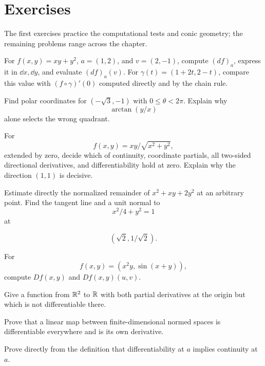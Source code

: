 \section*{Exercises}
The first exercises practice the computational tests and conic geometry;
the remaining problems range across the chapter.
\begin{exercise}
For $f(x,y)=xy+y^2$, $a=(1,2)$, and $v=(2,-1)$, compute $(df)_a$,
express it in $\dd x,\dd y$, and evaluate $(df)_a(v)$. For
$\gamma(t)=(1+2t,2-t)$, compare this value with $(f\circ\gamma)'(0)$
computed directly and by the chain rule.
\end{exercise}
\begin{exercise}
Find polar coordinates for $(-\sqrt3,-1)$ with $0\leq\theta<2\pi$.
Explain why
\[
\arctan(y/x)
\]
 alone selects the wrong quadrant.
\end{exercise}
\begin{exercise}
For
\[
f(x,y)=xy/\sqrt{x^2+y^2},
\]
 extended by zero, decide which of continuity,
coordinate partials, all two-sided directional derivatives, and differentiability
hold at zero. Explain why the direction $(1,1)$ is decisive.
\end{exercise}
\begin{exercise}
Estimate directly the normalized remainder of $x^2+xy+2y^2$ at an arbitrary
point. Find the tangent line and a unit normal to
\[
x^2/4+y^2=1
\]
 at

\[
(\sqrt2,1/\sqrt2).
\]

\end{exercise}



\begin{exercise}
For
\[
f(x,y)=(x^2y,\sin(x+y)),
\]
compute $Df(x,y)$ and $Df(x,y)(u,v)$.
\end{exercise}

\begin{exercise}
Give a function from $\mathbb{R}^2$ to $\mathbb{R}$ with both partial derivatives at the
origin but which is not differentiable there.
\end{exercise}

\begin{exercise}
Prove that a linear map between finite-dimensional normed spaces is
differentiable everywhere and is its own derivative.
\end{exercise}

\begin{exercise}
Prove directly from the definition that differentiability at $a$ implies
continuity at $a$.
\end{exercise}


